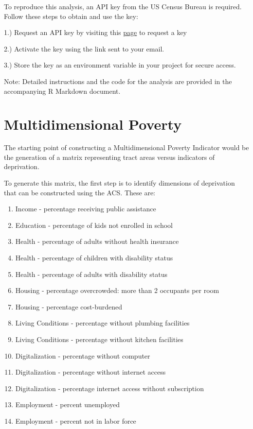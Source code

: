 \documentclass[
  letterpaper,
  DIV=11,
  numbers=noendperiod]{scrreprt}
\begin{document}
To reproduce this analysis, an API key from the US Census Bureau is
required. Follow these steps to obtain and use the key:

1.) Request an API key by visiting this
\href{https://api.census.gov/data/key_signup.html}{page} to request a
key

2.) Activate the key using the link sent to your email.

3.) Store the key as an environment variable in your project for secure
access.

Note: Detailed instructions and the code for the analysis are provided
in the accompanying R Markdown document.


\chapter{Multidimensional Poverty}\label{multidimensional-poverty}

The starting point of constructing a Multidimensional Poverty Indicator
would be the generation of a matrix representing tract areas versus
indicators of deprivation.

To generate this matrix, the first step is to identify dimensions of
deprivation that can be constructed using the ACS. These are:

\begin{enumerate}
\def\labelenumi{\arabic{enumi}.}
\item
  Income - percentage receiving public assistance
\item
  Education - percentage of kids not enrolled in school
\item
  Health - percentage of adults without health insurance
\item
  Health - percentage of children with disability status
\item
  Health - percentage of adults with disability status
\item
  Housing - percentage overcrowded: more than 2 occupants per room
\item
  Housing - percentage cost-burdened
\item
  Living Conditions - percentage without plumbing facilities
\item
  Living Conditions - percentage without kitchen facilities
\item
  Digitalization - percentage without computer
\item
  Digitalization - percentage without internet access
\item
  Digitalization - percentage internet access without subscription
\item
  Employment - percent unemployed
\item
  Employment - percent not in labor force
\end{enumerate}
\end{document}
